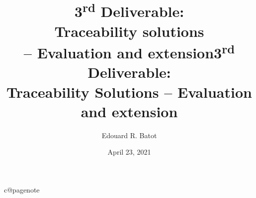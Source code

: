 \documentclass[12pt,twoside]{report}
\title{3\textsuperscript{rd} Deliverable:\\Traceability solutions \\ -- Evaluation and extension}
\author{
  Edouard R. Batot 
}
\date{ 
  April 23, 2021
}
\begin{document}
\maketitle 

\title{3\textsuperscript{rd} Deliverable:\\Traceability Solutions -- Evaluation and extension}

\tableofcontents

\cleardoublepage
\renewcommand{\sectionbreak}{}

\listoffigures
\lstlistoflistings
\renewcommand{\sectionbreak}{\cleardoublepage}
\cleardoublepage












%

%


\cleardoublepage





\makeatletter
\ifcsname c@pagenote\endcsname
{}
\fi
\makeatother

\end{document}
